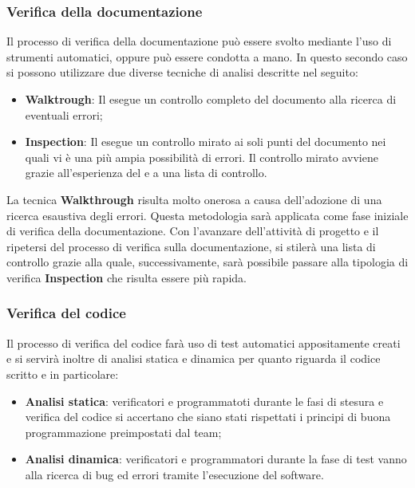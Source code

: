     \subsubsection{Verifica della documentazione}
    Il processo di verifica della documentazione può essere svolto mediante l'uso di strumenti automatici, oppure può essere condotta a mano. In questo secondo caso si possono utilizzare due diverse tecniche di analisi descritte nel seguito:
    \begin{itemize}
        \item \textbf{Walktrough}: Il \roleVerifierLow{} esegue un controllo completo del documento alla ricerca di eventuali errori;
        \item \textbf{Inspection}: Il \roleVerifierLow{} esegue un controllo mirato ai soli punti del documento nei quali vi è una più ampia possibilità di errori. Il controllo mirato avviene grazie all'esperienza del \roleVerifierLow{} e a una lista di controllo\glo{}.
    \end{itemize}
    La tecnica \textbf{Walkthrough} risulta molto onerosa a causa dell'adozione di una ricerca esaustiva degli errori. Questa metodologia sarà applicata come fase iniziale di verifica della documentazione. Con l'avanzare dell'attività di progetto e il ripetersi del processo di verifica sulla documentazione, si stilerà una lista di controllo\glo{} grazie alla quale, successivamente, sarà possibile passare alla tipologia di verifica \textbf{Inspection} che risulta essere più rapida.

    \subsubsection{Verifica del codice}
    Il processo di verifica del codice farà uso di test automatici appositamente creati e si servirà inoltre di analisi statica e dinamica per quanto riguarda il codice scritto e in particolare:
    \begin{itemize}
        \item \textbf{Analisi statica}: verificatori e programmatoti durante le fasi di stesura e verifica del codice si accertano che siano stati rispettati i principi di buona programmazione preimpostati dal team;
        \item \textbf{Analisi dinamica}: verificatori e programmatori durante la fase di test vanno alla ricerca di bug\glo{} ed errori tramite l'esecuzione del software.  
    \end{itemize}

